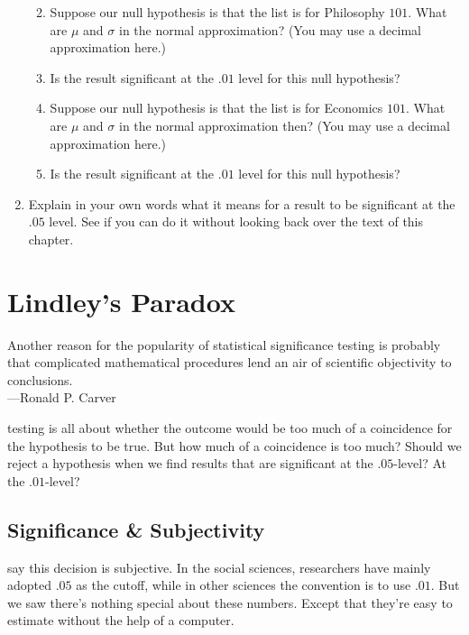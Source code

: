 \documentclass[justified]{tufte-book}
\providecommand{\tightlist}{%
  \setlength{\itemsep}{0pt}\setlength{\parskip}{0pt}}
\newenvironment{epigraph}%
{
\begin{flushright}    
\begin{minipage}{20em}
\begin{flushright}
\itshape
}%
{
\end{flushright}
\end{minipage}
\end{flushright}
}
\theoremstyle{definition}
\theoremstyle{definition}
\theoremstyle{definition}
\theoremstyle{remark}
\begin{document}
\begin{enumerate}
  \begin{enumerate}
  \def\labelenumii{\alph{enumii}.}
  \tightlist
  \item
    Suppose our null hypothesis is that the list is for Philosophy \(101\). What are \(\mu\) and \(\sigma\) in the normal approximation? (You may use a decimal approximation here.)
  \item
    Is the result significant at the \(.01\) level for this null hypothesis?
  \item
    Suppose our null hypothesis is that the list is for Economics \(101\). What are \(\mu\) and \(\sigma\) in the normal approximation then? (You may use a decimal approximation here.)
  \item
    Is the result significant at the \(.01\) level for this null hypothesis?
  \end{enumerate}
\item
  Explain in your own words what it means for a result to be significant at the \(.05\) level. See if you can do it without looking back over the text of this chapter.
\end{enumerate}

\hypertarget{chlindley}{%
\chapter{Lindley's Paradox}\label{chlindley}}

\begin{epigraph}
Another reason for the popularity of statistical significance testing is
probably that complicated mathematical procedures lend an air of
scientific objectivity to conclusions.\\
---Ronald P. Carver
\end{epigraph}

 testing is all about whether the outcome would be too much of a coincidence for the hypothesis to be true. But how much of a coincidence is too much? Should we reject a hypothesis when we find results that are significant at the \(.05\)-level? At the \(.01\)-level?

\hypertarget{significance-subjectivity}{%
\section{Significance \& Subjectivity}\label{significance-subjectivity}}

 say this decision is subjective. In the social sciences, researchers have mainly adopted \(.05\) as the cutoff, while in other sciences the convention is to use \(.01\). But we saw there's nothing special about these numbers. Except that they're easy to estimate without the help of a computer.
\end{document}
